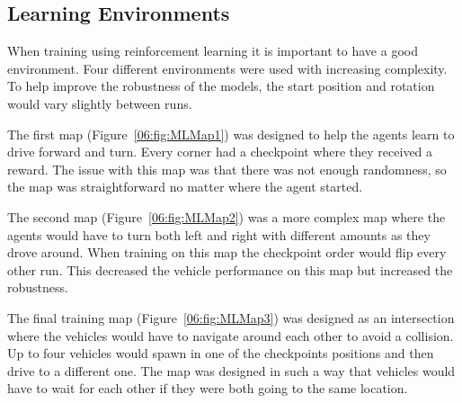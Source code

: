 




\subsection{Learning Environments}
When training using reinforcement learning it is important to have a good environment. Four different environments were used with increasing complexity. To help improve the robustness of the models, the start position and rotation would vary slightly between runs. 

The first map (Figure~\ref{06:fig:MLMap1}) was designed to help the agents learn to drive forward and turn. Every corner had a checkpoint where they received a reward. The issue with this map was that there was not enough randomness, so the map was straightforward no matter where the agent started. 

The second map (Figure~\ref{06:fig:MLMap2}) was a more complex map where the agents would have to turn both left and right with different amounts as they drove around. When training on this map the checkpoint order would flip every other run. This decreased the vehicle performance on this map but increased the robustness. 

The final training map (Figure~\ref{06:fig:MLMap3}) was designed as an intersection where the vehicles would have to navigate around each other to avoid a collision. Up to four vehicles would spawn in one of the checkpoints positions and then drive to a different one. The map was designed in such a way that vehicles would have to wait for each other if they were both going to the same location. 


